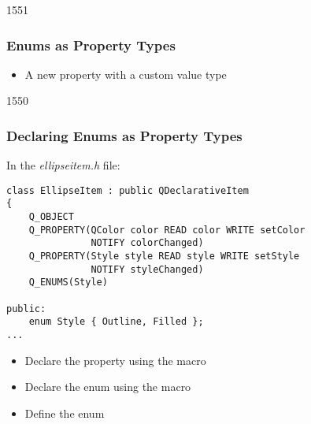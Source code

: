 \begin{slide}[fragile]{1551}\frametitle{Enums as Property Types}


\begin{itemize}
\item A new  property with a custom value type
\end{itemize}

\end{slide}

\begin{slide}[fragile]{1550}\frametitle{Declaring Enums as Property Types}

In the \textit{ellipseitem.h} file:

\vspace*{0.25em}
\begin{lstlisting}
class EllipseItem : public QDeclarativeItem
{
    Q_OBJECT
    Q_PROPERTY(QColor color READ color WRITE setColor
               NOTIFY colorChanged)
    Q_PROPERTY(Style style READ style WRITE setStyle
               NOTIFY styleChanged)
    Q_ENUMS(Style)

public:
    enum Style { Outline, Filled };
...
\end{lstlisting}

\begin{itemize}
\item Declare the  property using the 
      macro
\item Declare the  enum using the 
      macro
\item Define the  enum
\end{itemize}

\end{slide}

